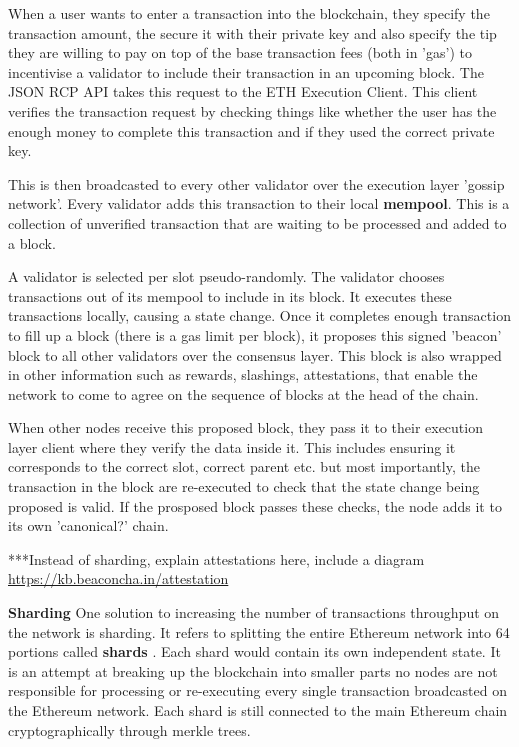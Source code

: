 When a user wants to enter a transaction into the blockchain, they specify the transaction amount, the secure it with their private key and also specify the tip they are willing to pay on top of the base transaction fees (both in 'gas') to incentivise a validator to include their transaction in an upcoming block. The JSON RCP API takes this request to the ETH Execution Client. This client verifies the transaction request by checking things like whether the user has the enough money to complete this transaction and if they used the correct private key. \cite{EthereumEthereum.org} 

This is then broadcasted to every other validator over the execution layer 'gossip network'. Every validator adds this transaction to their local \textbf{mempool}. This is a collection of unverified transaction that are waiting to be processed and added to a block.

A validator is selected per slot pseudo-randomly. The validator chooses transactions out of its mempool to include in its block. It executes these transactions locally, causing a state change. Once it completes enough transaction to fill up a block (there is a gas limit per block), it proposes this signed 'beacon' block to all other validators over the consensus layer. This block is also wrapped in other information such as rewards, slashings, attestations, that enable the network to come to agree on the sequence of blocks at the head of the chain.

When other nodes receive this proposed block, they pass it to their execution layer client where they verify the data inside it. This includes ensuring it corresponds to the correct slot, correct parent etc. but most importantly, the transaction in the block are re-executed to check that the state change being proposed is valid. If the prosposed block passes these checks, the node adds it to its own 'canonical?' chain.  \cite{EthereumEthereum.org} 


***Instead of sharding, explain attestations here, include a diagram \url{https://kb.beaconcha.in/attestation}

\textbf{Sharding} \label{Sharding}
One solution to increasing the number of transactions throughput on the network is sharding. It refers to splitting the entire Ethereum network into 64 portions called \textbf{shards} \cite{Buterin2020Annotated-spec/beacon-chain.mdEthereum/annotated-spec}. Each shard would contain its own independent state. It is an attempt at breaking up the blockchain into smaller parts no nodes are not responsible for processing or re-executing every single transaction broadcasted on the Ethereum network. Each shard is still connected to the main Ethereum chain cryptographically through merkle trees. \cite{EthereumEthereum.org} 


